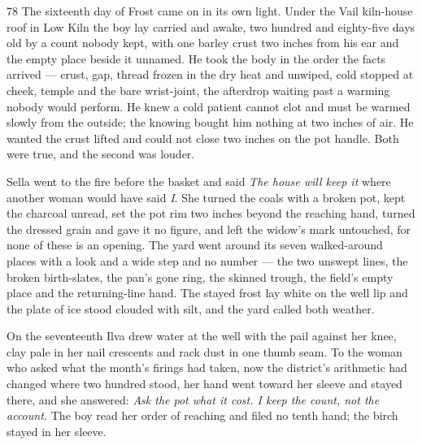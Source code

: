 
\scenebreak


\scenebreak


\scenebreak

\CRtailpiece
\begin{CRchronicle}{78}
The sixteenth day of Frost came on in its own light. Under the Vail kiln-house roof in Low Kiln the boy lay carried and awake, two hundred and eighty-five days old by a count nobody kept, with one barley crust two inches from his ear and the empty place beside it unnamed. He took the body in the order the facts arrived — crust, gap, thread frozen in the dry heat and unwiped, cold stopped at cheek, temple and the bare wrist-joint, the afterdrop waiting past a warming nobody would perform. He knew a cold patient cannot clot and must be warmed slowly from the outside; the knowing bought him nothing at two inches of air. He wanted the crust lifted and could not close two inches on the pot handle. Both were true, and the second was louder.

Sella went to the fire before the basket and said \emph{The house will keep it} where another woman would have said \emph{I}. She turned the coals with a broken pot, kept the charcoal unread, set the pot rim two inches beyond the reaching hand, turned the dressed grain and gave it no figure, and left the widow’s mark untouched, for none of these is an opening. The yard went around its seven walked-around places with a look and a wide step and no number — the two unswept lines, the broken birth-slates, the pan’s gone ring, the skinned trough, the field’s empty place and the returning-line hand. The stayed frost lay white on the well lip and the plate of ice stood clouded with silt, and the yard called both weather.

On the seventeenth Ilva drew water at the well with the pail against her knee, clay pale in her nail crescents and rack dust in one thumb seam. To the woman who asked what the month’s firings had taken, now the district’s arithmetic had changed where two hundred stood, her hand went toward her sleeve and stayed there, and she answered: \emph{Ask the pot what it cost. I keep the count, not the account.} The boy read her order of reaching and filed no tenth hand; the birch stayed in her sleeve.


\end{CRchronicle}
